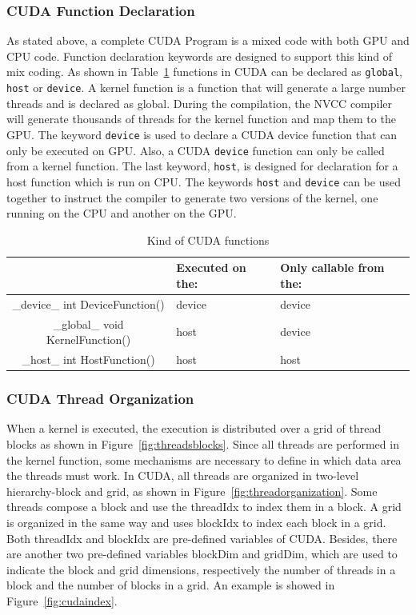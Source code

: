 \documentclass[Ingles]{ic-tese-v1}
\newcommand{\rfig}[1]{Figure~\ref{fig:#1}}
\newcommand{\ttt}[1]{{\texttt{#1}}}
\begin{document}
\subsubsection{CUDA Function Declaration}
\label{CUDAfunction}

As stated above, a complete CUDA Program is a mixed code with both GPU and CPU
code. Function declaration keywords are designed to support this kind of mix
coding. As shown in Table~\ref{tab:cudaFunction} functions in CUDA can be
declared as \ttt{global}, \ttt{host} or \ttt{device}. A kernel function is a function that will
generate a large number threads and is declared as global. During the
compilation, the NVCC compiler will generate thousands of threads for the
kernel function and map them to the GPU. The keyword \ttt{device} is used to declare
a CUDA device function that can only be executed on GPU. Also, a CUDA
\ttt{device} function can only be called from a kernel function. The last keyword,
\ttt{host}, is designed for declaration for a host function which is run on CPU. The
keywords \ttt{host} and \ttt{device} can be used  together to instruct the compiler to
generate two versions of the kernel, one running on the CPU and another on the
GPU.

\begin{table}[!t]
	\caption[small]{Kind of CUDA functions}
\begin{center}
	\begin{tabular}{ | c | >{\centering\arraybackslash}p{2cm} | >{\centering\arraybackslash}p{3cm} |}
		\hline
		 & Executed on the: & Only callable from the: \\ \hline
		{\color{blue} \_device\_} int DeviceFunction() & device & device \\ \hline
		{\color{blue} \_global\_} void KernelFunction()& host & device \\ \hline
		{\color{blue} \_host\_} int HostFunction() & host & host\\
		\hline
	\end{tabular}
\end{center}
\label{tab:cudaFunction}
\end{table}

\subsubsection{CUDA Thread Organization}
\label{CUDA Thread Organization}
When a kernel is executed, the execution is distributed over a grid of thread
blocks as shown in \rfig{threadsblocks}. Since all threads are performed in the
kernel function, some mechanisms are necessary to define in which data area the
threads must work. In CUDA, all threads are organized in two-level
hierarchy-block and grid, as shown in \rfig{threadorganization}. Some
threads compose a block and use the threadIdx to index them in a block. A grid
is organized in the same way and uses blockIdx to index each block in a grid.
Both threadIdx and blockIdx are pre-defined variables of CUDA. Besides,
there are another two pre-defined variables blockDim and gridDim, which are
used to indicate the block and grid dimensions, respectively the number of threads in a block and the number of blocks in a grid. An example is showed in \rfig{cudaindex}.
\end{document}
